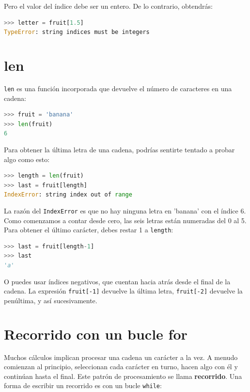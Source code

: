 Pero el valor del índice debe ser un entero. De lo contrario, obtendrás:

\begin{lstlisting}[language=Python]
>>> letter = fruit[1.5]
TypeError: string indices must be integers
\end{lstlisting}

\section{len}

\texttt{len} es una función incorporada que devuelve el número de caracteres en una cadena:

\begin{lstlisting}[language=Python]
>>> fruit = 'banana'
>>> len(fruit)
6
\end{lstlisting}

Para obtener la última letra de una cadena, podrías sentirte tentado a probar algo como esto:

\begin{lstlisting}[language=Python]
>>> length = len(fruit)
>>> last = fruit[length]
IndexError: string index out of range
\end{lstlisting}

La razón del \texttt{IndexError} es que no hay ninguna letra en 'banana' con el índice 6. Como comenzamos a contar desde cero, las seis letras están numeradas del 0 al 5. Para obtener el último carácter, debes restar 1 a \texttt{length}:

\begin{lstlisting}[language=Python]
>>> last = fruit[length-1]
>>> last
'a'
\end{lstlisting}

O puedes usar índices negativos, que cuentan hacia atrás desde el final de la cadena. La expresión \texttt{fruit[-1]} devuelve la última letra, \texttt{fruit[-2]} devuelve la penúltima, y así sucesivamente.

\section{Recorrido con un bucle for}

Muchos cálculos implican procesar una cadena un carácter a la vez. A menudo comienzan al principio, seleccionan cada carácter en turno, hacen algo con él y continúan hasta el final. Este patrón de procesamiento se llama \textbf{recorrido}. Una forma de escribir un recorrido es con un bucle \texttt{while}:

